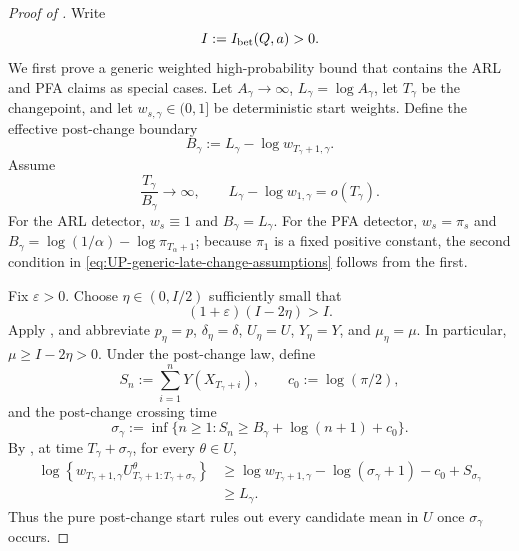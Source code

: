 \documentclass[12pt]{article}
\theoremstyle{spaced}
\theoremstyle{remark}
\begin{document}
\begin{proof}[Proof of ]
Write
\[
 I:=I_{\rm bet}(Q,a)>0.
\]
We first prove a generic weighted high-probability bound that contains the
ARL and PFA claims as special cases.  Let $A_\gamma\to\infty$,
$L_\gamma=\log A_\gamma$, let $T_\gamma$ be the changepoint, and let
$w_{s,\gamma}\in(0,1]$ be deterministic start weights.  Define the effective
post-change boundary
\begin{equation}
\label{eq:UP-effective-boundary-detailed}
 B_\gamma
 :=L_\gamma-\log w_{T_\gamma+1,\gamma}.
\end{equation}
Assume
\begin{equation}
\label{eq:UP-generic-late-change-assumptions}
 \frac{T_\gamma}{B_\gamma}\longrightarrow\infty,
 \qquad
 L_\gamma-\log w_{1,\gamma}=o(T_\gamma).
\end{equation}
For the ARL detector, $w_s\equiv1$ and $B_\gamma=L_\gamma$.  For the PFA
detector, $w_s=\pi_s$ and
$B_\gamma=\log(1/\alpha)-\log\pi_{T_\alpha+1}$; because $\pi_1$ is a fixed
positive constant, the second condition in
\eqref{eq:UP-generic-late-change-assumptions} follows from the first.

Fix $\varepsilon>0$.  Choose $\eta\in(0,I/2)$ sufficiently small that
\begin{equation}
\label{eq:UP-eta-choice-detailed}
 (1+\varepsilon)(I-2\eta)>I.
\end{equation}
Apply , and abbreviate
$p_\eta=p$, $\delta_\eta=\delta$, $U_\eta=U$,
$Y_\eta=Y$, and $\mu_\eta=\mu$.  In particular,
$\mu\ge I-2\eta>0$.  Under the post-change law, define
\[
 S_n:=\sum_{i=1}^nY(X_{T_\gamma+i}),
 \qquad
 c_0:=\log(\pi/2),
\]
and the post-change crossing time
\begin{equation}
\label{eq:UP-post-crossing-time-detailed}
 \sigma_\gamma
 :=\inf\{n\ge1:
   S_n\ge B_\gamma+\log(n+1)+c_0
 \}.
\end{equation}
By , at time
$T_\gamma+\sigma_\gamma$, for every $\theta\in U$,
\begin{align}
 \log\left\{
   w_{T_\gamma+1,\gamma}
   U_{T_\gamma+1:T_\gamma+\sigma_\gamma}^{\theta}
 \right\}
 &\ge
 \log w_{T_\gamma+1,\gamma}
 -\log(\sigma_\gamma+1)-c_0+S_{\sigma_\gamma}
 \\
 &\ge L_\gamma.
\label{eq:UP-inner-threshold-detailed}
\end{align}
Thus the pure post-change start rules out every candidate mean in $U$ once
$\sigma_\gamma$ occurs.


\end{proof}
\end{document}

